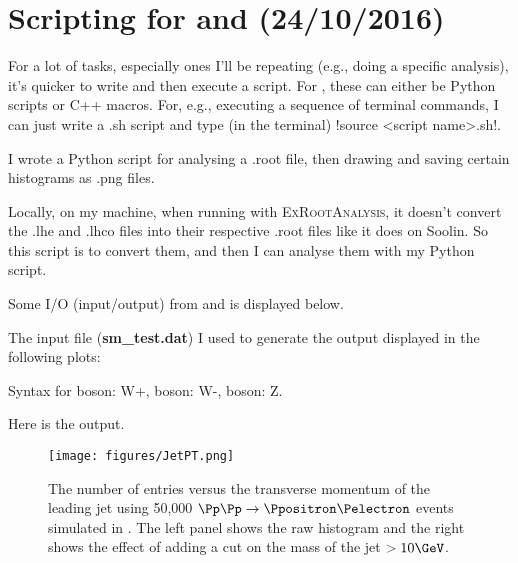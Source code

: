 
\chapter{Scripting for \madgraph and \ROOT (24/10/2016)}

For a lot of tasks, especially ones I'll be repeating (e.g., doing a specific analysis), it's quicker to write and then execute a script. For \ROOT, these can either be Python scripts or C++ macros. For, e.g., executing a sequence of terminal commands, I can just write a .sh script and type (in the terminal) !source <script name>.sh!.

I wrote a Python script for analysing a .root file, then drawing and saving certain histograms as .png files.



Locally, on my machine, when running \madgraph with \textsc{ExRootAnalysis}, it doesn't convert the .lhe and .lhco files into their respective .root files like it does on Soolin. So this script is to convert them, and then I can analyse them with my Python script.



Some I/O (input/output) from \madgraph and \ROOT is displayed below.

The input file (\textbf{sm\_test.dat}) I used to generate the output displayed in the following plots:



Syntax for \PWplus boson: W+, \PWminus boson: W-, \PZzero boson: Z.

Here is the output.

\begin{figure}[htbp]
\centering
\texttt{[image: figures/JetPT.png]}
\caption{The number of entries versus the transverse momentum of the leading jet using 50,000 $\Pp\Pp \rightarrow \Ppositron \Pelectron$ events simulated in \madgraph. The left panel shows the raw histogram and the right shows the effect of adding a cut on the mass of the jet $>10\GeV$.}
\end{figure}


